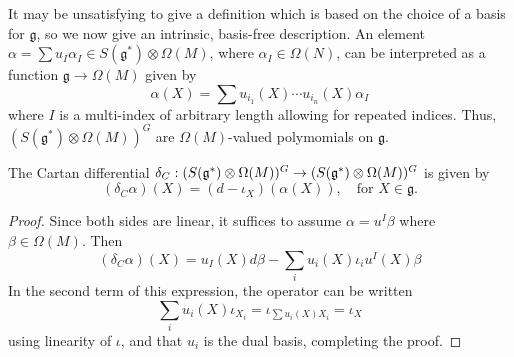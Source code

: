 It may be unsatisfying to give a definition which is based on the choice of a
basis for $\mathfrak{g}$, so we now give an intrinsic, basis-free description.
An element $\alpha = \sum u_I \alpha_I \in S(\mathfrak{g}^*) \otimes
\Omega(M)$, where  $\alpha_I \in \Omega(N)$, can be interpreted as a function
$\mathfrak{g} \to \Omega(M)$ given by 
\[
	\alpha(X) = \sum u_{i_1}(X)\cdots u_{i_n}(X) \alpha_I 
\] 
where $I$ is a multi-index of arbitrary length allowing for repeated indices.
Thus, $(S(\mathfrak{g}^*)\otimes \Omega(M))^G$ are $\Omega(M)$-valued
polymomials on  $\mathfrak{g}$. 
\begin{thm} \label{thm:cartan_diff} %
	The Cartan differential 
	$\delta_C : (S(\operatorname{\mathfrak{g}}^*)\otimes \Omega(M))^G \to (S(\operatorname{\mathfrak{g}}^*)\otimes \Omega(M))^G$
	is given by
	\[
		(\delta_C \alpha)(X) = (d - \iota_X)(\alpha(X)), \quad 
		\text{for } X\in\mathfrak{g}.
	\] 
\end{thm}
\begin{proof}
	Since both sides are linear, it suffices to assume $\alpha = u^I\beta$ where
	$\beta\in\Omega(M)$. Then 
	 \[
	(\delta_C \alpha)(X) = u_I(X) d\beta - \sum_i u_i(X)\iota_i u^I(X)\beta
	\] 
	In the second term of this expression, the operator can be written 
	\[
	\sum_i u_i(X)\iota_{X_i} =  \iota_{\sum u_i(X)X_i } = \iota_X
	\] 
	using linearity of $\iota$, and that  $u_i$ is the dual
	basis, completing the proof.
\end{proof}

